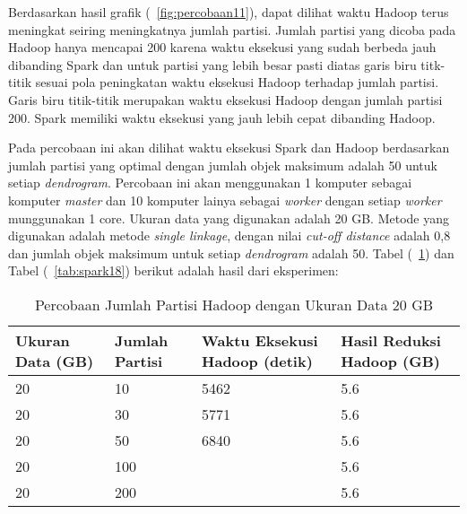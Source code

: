 Berdasarkan hasil grafik (~\ref{fig:percobaan11}), dapat dilihat waktu Hadoop terus meningkat seiring meningkatnya jumlah partisi. Jumlah partisi yang dicoba pada Hadoop hanya mencapai 200 karena waktu eksekusi yang sudah berbeda jauh dibanding Spark dan untuk partisi yang lebih besar pasti diatas garis biru titk-titik sesuai pola peningkatan waktu eksekusi Hadoop terhadap jumlah partisi. Garis biru titik-titik merupakan waktu eksekusi Hadoop dengan jumlah partisi 200. Spark memiliki waktu eksekusi yang jauh lebih cepat dibanding Hadoop. 




Pada percobaan ini akan dilihat waktu eksekusi Spark dan Hadoop berdasarkan jumlah partisi yang optimal dengan jumlah objek maksimum adalah 50 untuk setiap \textit{dendrogram}. Percobaan ini akan menggunakan 1 komputer sebagai komputer \textit{master} dan 10 komputer lainya sebagai \textit{worker} dengan setiap \textit{worker} munggunakan 1 core. Ukuran data yang digunakan adalah 20 GB. Metode yang digunakan adalah metode \textit{single linkage}, dengan nilai \textit{cut-off distance} adalah 0,8 dan jumlah objek maksimum untuk setiap \textit{dendrogram} adalah 50. Tabel (~\ref{tab:spark17}) dan Tabel (~\ref{tab:spark18}) berikut adalah hasil dari eksperimen:





\begin{table}[H] 
	\centering 
	\caption{Percobaan Jumlah Partisi Hadoop dengan Ukuran Data 20 GB}
	\label{tab:spark17}
	\begin{tabular}{|p{3cm}|p{3cm}|p{4cm}|p{4cm}|}
\hline
Ukuran Data (GB) & Jumlah Partisi &  Waktu Eksekusi Hadoop (detik) & Hasil Reduksi Hadoop (GB)\\
\hline
20 & 10 & 5462  & 5.6  \\
\hline
20 & 30 & 5771  & 5.6  \\
\hline
20 & 50 & 6840  & 5.6  \\
\hline
20 & 100 &   & 5.6  \\
\hline
20 & 200 &   & 5.6  \\
\hline


\hline

	\end{tabular} 
\end{table}




